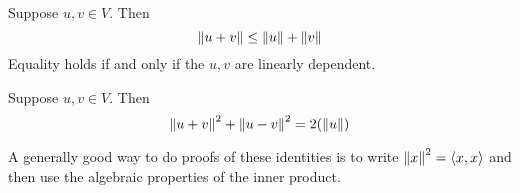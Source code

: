 \begin{theorem} 
    Suppose $u, v \in V$. Then
    \[ \norm{u + v} \leq \norm{u} + \norm{v} \]
    Equality holds if and only if the $u, v$ are linearly dependent.
\end{theorem}

\begin{theorem} 
    Suppose $u, v \in V$. Then
    \[ \norm{u + v}^2 + \norm{u - v}^2 = 2(\norm{u}) \]
\end{theorem}

A generally good way to do proofs of these identities is to write $\norm{x}^2 = \left\langle x , x \right\rangle$ and then
use the algebraic properties of the inner product.
\endinput